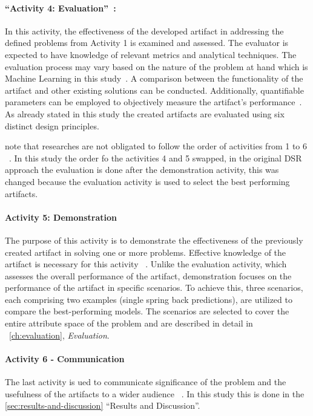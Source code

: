 \paragraph{``Activity 4: Evaluation''~\cite[p. 56]{peffers_designscienceresearch_2007}:}
In this activity, the effectiveness of the developed artifact in addressing the defined problems from Activity 1 is
examined and assessed.
The evaluator is expected to have knowledge of relevant metrics and analytical techniques.
The evaluation process may vary based on the nature of the problem at hand which is Machine Learning in this
study~\cite[p. 56]{peffers_designscienceresearch_2007}.
A comparison between the functionality of the artifact and other existing solutions can be conducted.
Additionally, quantifiable parameters can be employed to objectively measure the artifact's
performance~\cite[p. 56]{peffers_designscienceresearch_2007}.
As already stated in this study the created artifacts are evaluated using six distinct design principles.


\cite{peffers_designscienceresearch_2007} note that researches are not obligated to follow the order of activities
from 1 to 6
~\cite[p. 56]{peffers_designscienceresearch_2007}.
In this study the order fo the activities 4 and 5 swapped, in the original DSR approach the evaluation is done after
the demonstration activity, this was changed because the evaluation activity is used to select the best performing
artifacts.

\paragraph{Activity 5: Demonstration}
The purpose of this activity is to demonstrate the effectiveness of the previously created artifact in solving one or
more problems.
Effective knowledge of the artifact is necessary for this activity
~\cite[p. 55]{peffers_designscienceresearch_2007}.
Unlike the evaluation activity, which assesses the overall performance of the artifact, demonstration focuses on the
performance of the artifact in specific scenarios.
To achieve this, three scenarios, each comprising two examples (single spring back predictions), are utilized to
compare the best-performing models.
The scenarios are selected to cover the entire attribute space of the problem and are described in detail in
~\cref{ch:evaluation}, \textit{Evaluation}.

\paragraph{Activity 6 - Communication}
The last activity is ued to communicate significance of the problem and the usefulness of the artifacts to a wider
audience
~\cite[p. 56]{peffers_designscienceresearch_2007}.
In this study this is done in the \cref{sec:results-and-discussion} ``Results and Discussion''.


